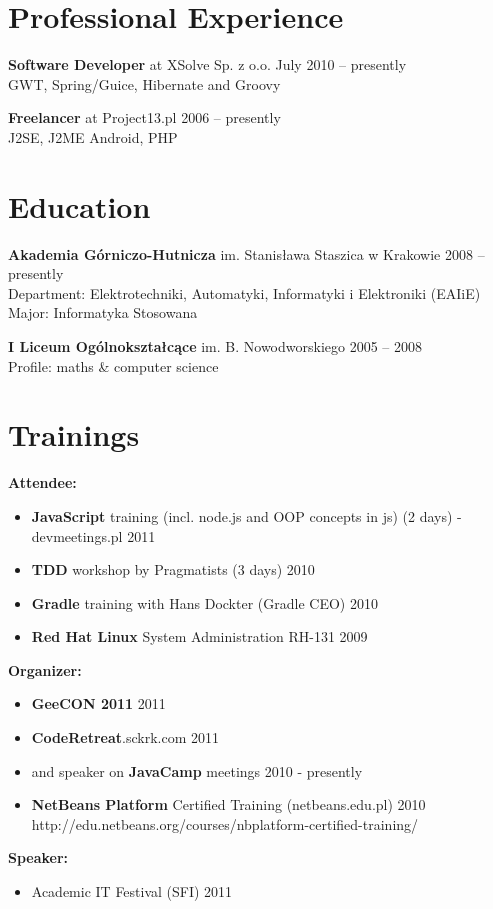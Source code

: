 \documentclass{res}
\begin{document}
\begin{resume} 

\section{Professional Experience}
{\bf Software Developer} at XSolve Sp. z o.o. \hfill July 2010 – presently\\
	GWT, Spring/Guice, Hibernate and Groovy

{\bf Freelancer} at Project13.pl \hfill 2006 – presently\\
	J2SE, J2ME Android, PHP 

\section{Education} 
{\bf Akademia Górniczo-Hutnicza} im. Stanisława Staszica w Krakowie \hfill 2008 – presently\\
	Department: Elektrotechniki, Automatyki, Informatyki i Elektroniki (EAIiE) \\
	Major: Informatyka Stosowana 

{\bf I Liceum Ogólnokształcące} im. B. Nowodworskiego \hfill 2005 – 2008\\
	Profile: maths \& computer science

\section{Trainings} 
{\bf Attendee:}
\begin{itemize}
 \item \textbf{JavaScript} training (incl. node.js and OOP concepts in js) (2 days) - devmeetings.pl \hfill 2011
 \item \textbf{TDD} workshop by Pragmatists (3 days) \hfill 2010
 \item \textbf{Gradle} training with Hans Dockter (Gradle CEO) \hfill 2010
 \item \textbf{Red Hat Linux} System Administration RH-131 \hfill 2009
\end{itemize}
{\bf Organizer:}
\begin{itemize}
 \item \textbf{GeeCON 2011} \hfill 2011
 \item \textbf{CodeRetreat}.sckrk.com \hfill 2011
 \item and speaker on \textbf{JavaCamp} meetings \hfill 2010 - presently
 \item \textbf{NetBeans Platform} Certified Training (netbeans.edu.pl) \hfill 2010 \\
	http://edu.netbeans.org/courses/nbplatform-certified-training/ 
\end{itemize}
{\bf Speaker:}
\begin{itemize}
 \item Academic IT Festival (SFI) \hfill 2011
\end{itemize}


\end{resume}
\end{document}
